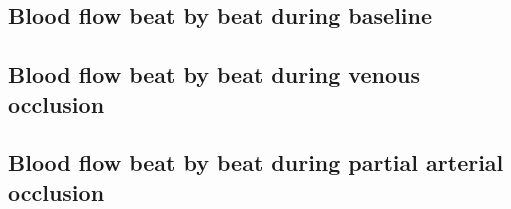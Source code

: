 \subsection{Blood flow beat by beat during baseline}
\label{section5.5.1}

\subsection{Blood flow beat by beat during venous occlusion}
\label{section5.5.2}

\subsection{Blood flow beat by beat during partial arterial occlusion}
\label{section5.5.3}
